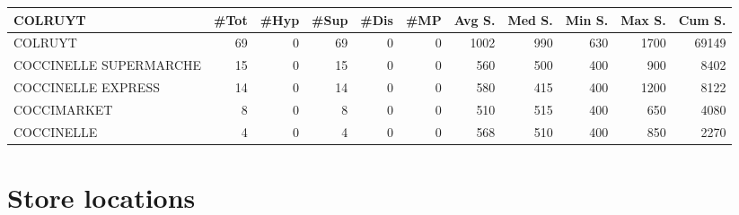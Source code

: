 \documentclass[11pt]{article}
\begin{document}
\begin{table}[H]
\footnotesize
\setlength{\tabcolsep}{2pt}
\begin{tabular}{lrrrrrrrrrr}
\toprule
COLRUYT &       \#Tot &       \#Hyp &       \#Sup &       \#Dis &        \#MP &     Avg S. &     Med S. &     Min S. &     Max S. &     Cum S. \\
\midrule
COLRUYT                &         69 &          0 &         69 &          0 &          0 &       1002 &        990 &        630 &       1700 &      69149 \\
COCCINELLE SUPERMARCHE &         15 &          0 &         15 &          0 &          0 &        560 &        500 &        400 &        900 &       8402 \\
COCCINELLE EXPRESS     &         14 &          0 &         14 &          0 &          0 &        580 &        415 &        400 &       1200 &       8122 \\
COCCIMARKET            &          8 &          0 &          8 &          0 &          0 &        510 &        515 &        400 &        650 &       4080 \\
COCCINELLE             &          4 &          0 &          4 &          0 &          0 &        568 &        510 &        400 &        850 &       2270 \\
\bottomrule
\end{tabular}
\end{table}

\section{Store locations}
\end{document}
